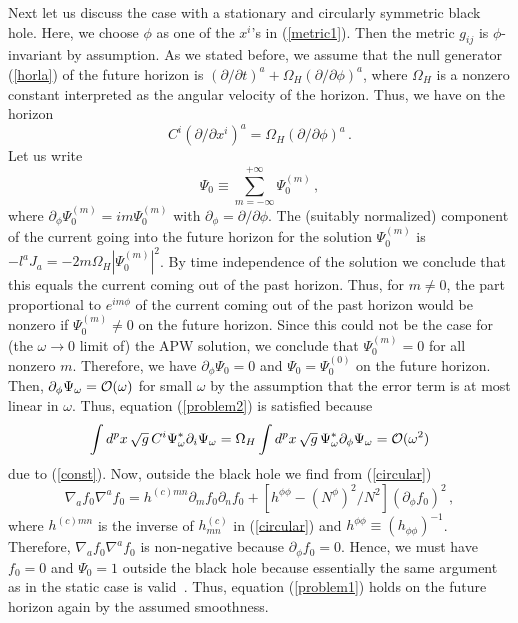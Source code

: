 \documentclass[a4paper,12pt]{article}
\begin{document}
Next let us discuss the case with a stationary and circularly symmetric
black hole.
Here, we choose $\phi$ as one
of the $x^i$'s in (\ref{metric1}).  Then the metric $g_{ij}$ 
is $\phi$-invariant by assumption.
As we stated before, we assume that the null generator (\ref{horla}) of the
future horizon is 
$(\partial/\partial t)^a + \Omega_H(\partial/\partial \phi)^a$, where
$\Omega_H$ is a nonzero constant interpreted as the angular velocity of the
horizon.  Thus, we have on the horizon
\begin{equation}
C^i (\partial/\partial x^i)^a =
\Omega_H (\partial/\partial \phi)^a\,. \label{const}
\end{equation}
Let us write 
\[
\Psi_0 \equiv \sum_{m=-\infty}^{+\infty} \Psi_0^{(m)}\,,
\]
where $\partial_\phi \Psi_0^{(m)} = im\Psi_0^{(m)}$ with 
$\partial_\phi = \partial/\partial \phi$.
The (suitably normalized)
component of the current going into the future horizon for the solution
$\Psi_0^{(m)}$ is
$-l^a J_a = -2m\Omega_H|\Psi_0^{(m)}|^2$. 
By time independence of the solution we conclude that this equals
the current coming out of the past horizon.
Thus, for $m\neq 0$, the part proportional to $e^{im\phi}$ of the
current coming out of the past horizon would be nonzero
if $\Psi_0^{(m)}\neq 0$ on the future horizon.  
Since this could not be the case
for (the $\omega \to 0$ limit of) the APW solution,
we conclude that $\Psi_0^{(m)}= 0$ for all nonzero $m$.
Therefore, we have $\partial_\phi\Psi_0 = 0$ and
$\Psi_0 = \Psi_0^{(0)}$ on the future horizon.
Then, $\partial_\phi \Psi_\omega = {\cal O}(\omega)$ for small $\omega$ 
by the assumption that the error term is at most linear in $\omega$.  Thus,
equation (\ref{problem2}) is satisfied because 
\begin{equation}
\int d^{p}x\,\sqrt{g}\,C^i\Psi_\omega^* \partial_i \Psi_\omega
= \Omega_H
\int d^{p}x\,\sqrt{g}\,\Psi_\omega^*\partial_\phi \Psi_\omega \nonumber
 =  {\cal O}(\omega^2)
\end{equation}
due to (\ref{const}).
Now, outside the black hole we find from (\ref{circular}) 
\[
\nabla_a f_0 \nabla^a f_0
= h^{(c)mn}\partial_m f_0 \partial_n f_0
+ \left[h^{\phi\phi}-(N^\phi)^2/N^2\right](\partial_\phi f_0)^2\,,
\]
where $h^{(c)mn}$ is the inverse of $h^{(c)}_{mn}$ in (\ref{circular}) and 
$h^{\phi\phi} \equiv (h_{\phi\phi})^{-1}$.
Therefore, $\nabla_a f_0 \nabla^a f_0$ 
is non-negative because $\partial_\phi f_0 = 0$.
Hence, we must have $f_0=0$ and $\Psi_0 = 1$ outside the black hole 
because essentially the same argument as in the static case is valid~\cite{BE2}.
Thus, equation (\ref{problem1}) holds
on the future horizon
again by the assumed smoothness.
\end{document}
